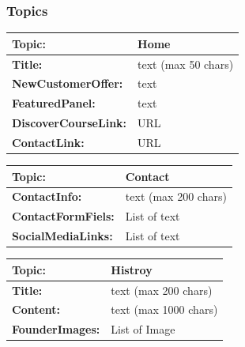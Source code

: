 \documentclass{article}
\begin{document}
\subsubsection{Topics}


\begin{center}
        \begin{tabularx}{\textwidth}{|>{\bfseries}l|X|}
                \hline
                Topic: & \textbf{Home} \\
                \hline
                Title: & text  (max 50 chars)\\
                \hline
                NewCustomerOffer: & text \\
                \hline
                FeaturedPanel: & text \\
                \hline
                DiscoverCourseLink: & URL \\
                \hline
                ContactLink: & URL \\
                \hline

        \end{tabularx}
        \caption{Table: Home}
\end{center}

\begin{center}
        \begin{tabularx}{\textwidth}{|>{\bfseries}l|X|}
                \hline
                Topic: & \textbf{Contact} \\
                \hline
                ContactInfo: & text  (max 200 chars)\\
                \hline
                ContactFormFiels: & List of text \\
                \hline
                SocialMediaLinks: & List of text \\
                \hline

        \end{tabularx}
        \caption{Table: Contact}
\end{center}


\begin{center}
        \begin{tabularx}{\textwidth}{|>{\bfseries}l|X|}
                \hline
                Topic: & \textbf{Histroy} \\
                \hline
                Title: & text  (max 200 chars)\\
                \hline
                Content: & text (max 1000 chars)\\
                \hline
                FounderImages: & List of {Image} \\
                \hline

        \end{tabularx}
        \caption{Table: History}
\end{center}
\end{document}
